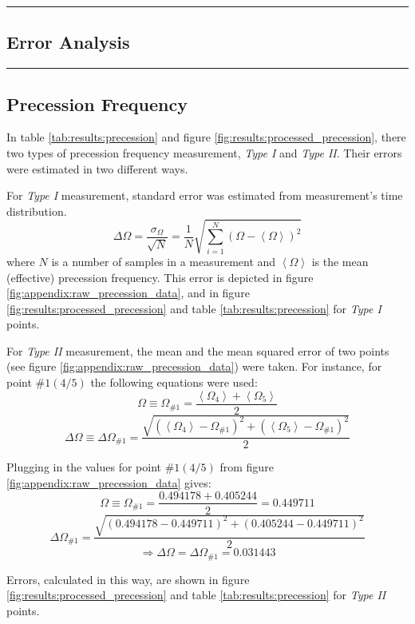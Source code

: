 {\color{gray}\hrule}
\begin{center}
\section{Error Analysis} \label{appendix:errors}
\bigskip
\end{center}
{\color{gray}\hrule}

\begin{multicols}{2}
\subsection{Precession Frequency}
\label{appendix:errors:precession_frequency}

In table \ref{tab:results:precession} and figure \ref{fig:results:processed_precession}, there two types of precession frequency measurement, \emph{Type I} and \emph{Type II}. Their errors were estimated in two different ways.

For \emph{Type I} measurement, standard error was estimated from measurement's time distribution.
\begin{equation*}
  \Delta\Omega = \frac{\sigma_{\Omega}}{\sqrt{N}} = \frac{1}{N}\sqrt{\sum\limits_{i=1}^N(\Omega - \left<\Omega\right>)^2}
\end{equation*}
where $N$ is a number of samples in a measurement and $\left< \Omega \right>$ is the mean (effective) precession frequency. This error is depicted in figure \ref{fig:appendix:raw_precession_data}, and in figure \ref{fig:results:processed_precession} and table \ref{tab:results:precession} for \emph{Type I} points.

For \emph{Type II} measurement, the mean and the mean squared error of two points (see figure \ref{fig:appendix:raw_precession_data}) were taken. For instance, for point $\#1 (4/5)$ the following equations were used:
\begin{equation*}
  \Omega \equiv \Omega_{\#1} = \frac{\left< \Omega_{4} \right> + \left< \Omega_{5} \right>}{2}
\end{equation*}
\begin{equation*}
  \Delta\Omega \equiv \Delta\Omega_{\#1} = \frac{\sqrt{(\left< \Omega_{4} \right> - \Omega_{\#1})^{2} + (\left< \Omega_{5} \right> - \Omega_{\#1})^{2}}}{2}
\end{equation*}

Plugging in the values for point $\#1 (4/5)$ from figure \ref{fig:appendix:raw_precession_data} gives:
\begin{equation*}
  \Omega \equiv \Omega_{\#1} = \frac{0.494178 + 0.405244}{2} = 0.449711
\end{equation*}
\begin{equation*}
  \Delta\Omega_{\#1} = \frac{\sqrt{(0.494178 - 0.449711)^{2} + (0.405244 - 0.449711)^{2}}}{2}
\end{equation*}
\begin{equation*}
  \Rightarrow \Delta \Omega = \Delta \Omega_{\#1} = 0.031443
\end{equation*}

Errors, calculated in this way, are shown in figure \ref{fig:results:processed_precession} and table \ref{tab:results:precession} for \emph{Type II} points.

\end{multicols}
